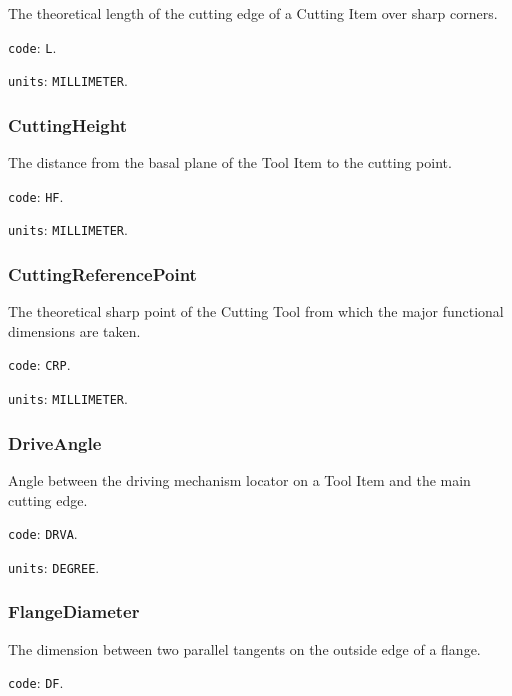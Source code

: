 The theoretical length of the cutting edge of a Cutting Item over sharp corners.


\texttt{code}: \texttt{L}.


\texttt{units}: \texttt{MILLIMETER}.



\subsubsection{CuttingHeight}
\label{sec:CuttingHeight}



The distance from the basal plane of the Tool Item to the cutting point.


\texttt{code}: \texttt{HF}.


\texttt{units}: \texttt{MILLIMETER}.



\subsubsection{CuttingReferencePoint}
\label{sec:CuttingReferencePoint}



The theoretical sharp point of the Cutting Tool from which the major functional dimensions are taken.


\texttt{code}: \texttt{CRP}.


\texttt{units}: \texttt{MILLIMETER}.



\subsubsection{DriveAngle}
\label{sec:DriveAngle}



Angle between the driving mechanism locator on a Tool Item and the main cutting edge.


\texttt{code}: \texttt{DRVA}.


\texttt{units}: \texttt{DEGREE}.



\subsubsection{FlangeDiameter}
\label{sec:FlangeDiameter}



The dimension between two parallel tangents on the outside edge of a flange.


\texttt{code}: \texttt{DF}.


